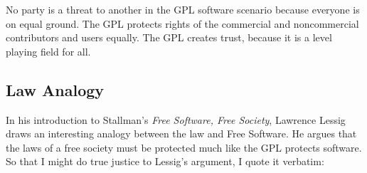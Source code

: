 \documentclass[11pt, letterpaper]{book}
\begin{document}
No party is a threat to another in the GPL software scenario because
everyone is on equal ground. The GPL protects rights of the commercial
and noncommercial contributors and users equally. The GPL creates trust,
because it is a level playing field for all.

\subsection{Law Analogy}

In his introduction to Stallman's \emph{Free Software, Free Society},
Lawrence Lessig draws an interesting analogy between the law and Free
Software. He argues that the laws of a free society must be protected
much like the GPL protects software. So that I might do true justice to
Lessig's argument, I quote it verbatim:
\end{document}
